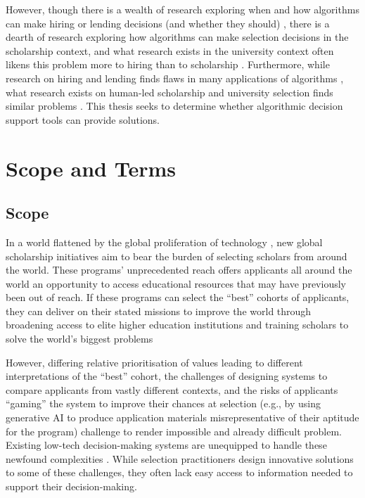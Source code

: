However, though there is a wealth of research exploring when and how algorithms can make hiring or lending decisions (and whether they should) \cite{schmidt1998validity,schumann2017diverse,raghavan2020mitigating,horodyski_applicants_2023,Leung_Zhang_Jibuti_Zhao_Klein_Pierce_Robert_Zhu_2020}, there is a dearth of research exploring how algorithms can make selection decisions in the scholarship context, and what research exists in the university context often likens this problem more to hiring than to scholarship \cite{schumann2017diverse}. Furthermore, while research on hiring and lending finds flaws in many applications of algorithms \cite{raghavan2020mitigating,horodyski_applicants_2023}, what research exists on human-led scholarship and university selection finds similar problems \cite{Peng_Nushi_Kıcıman_Inkpen_Suri_Kamar_2019}. This thesis seeks to determine whether algorithmic decision support tools can provide solutions.

\section{Scope and Terms}
\subsection{Scope}
In a world flattened by the global proliferation of technology \cite{Friedman_2005}, new global scholarship initiatives aim to bear the burden of selecting scholars from around the world. These programs' unprecedented reach offers applicants all around the world an opportunity to access educational resources that may have previously been out of reach. If these programs can select the ``best'' cohorts of applicants, they can deliver on their stated missions to improve the world through broadening access to elite higher education institutions and training scholars to solve the world's biggest problems

However, differing relative prioritisation of values leading to different interpretations of the ``best'' cohort, the challenges of designing systems to compare applicants from vastly different contexts, and the risks of applicants ``gaming'' the system to improve their chances at selection (e.g., by using generative AI to produce application materials misrepresentative of their aptitude for the program) challenge to render impossible and already difficult problem. Existing low-tech decision-making systems are unequipped to handle these newfound complexities \cite{Latzer_Hollnbuchner_Just_Saurwein_2014}. While selection practitioners design innovative solutions to some of these challenges, they often lack easy access to information needed to support their decision-making.

